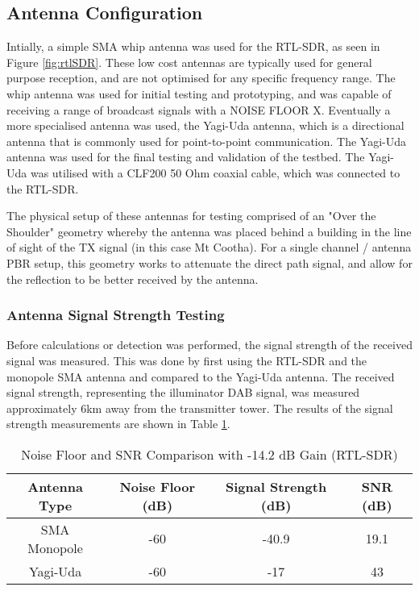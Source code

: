 \subsection{Antenna Configuration \label{sec:antenna}}
Intially, a simple SMA whip antenna was used for the RTL-SDR, as seen in Figure \ref{fig:rtlSDR}. These low cost antennas are typically used for general purpose reception, and are not optimised for any specific frequency range. The whip antenna was used for initial testing and prototyping, and was capable of receiving a range of broadcast signals with a NOISE FLOOR X. Eventually a more specialised antenna was used, the Yagi-Uda antenna, which is a directional antenna that is commonly used for point-to-point communication. The Yagi-Uda antenna was used for the final testing and validation of the testbed. The Yagi-Uda was utilised with a CLF200 50 Ohm coaxial cable, which was connected to the RTL-SDR. 



The physical setup of these antennas for testing comprised of an "Over the Shoulder" geometry whereby the antenna was placed behind a building in the line of sight of the TX signal (in this case Mt Cootha). For a single channel / antenna PBR setup, this geometry works to attenuate the direct path signal, and allow for the reflection to be better received by the antenna. 

\subsubsection{Antenna Signal Strength Testing} 
Before calculations or detection was performed, the signal strength of the received signal was measured. This was done by first using the RTL-SDR and the monopole SMA antenna and compared to the Yagi-Uda antenna. The received signal strength, representing the illuminator DAB signal, was measured approximately 6km away from the transmitter tower.  The results of the signal strength measurements are shown in Table \ref{tab:signalstrength}.

\begin{table}[h!]
    \centering
    \caption{Noise Floor and SNR Comparison with -14.2 dB Gain (RTL-SDR)}
    \label{tab:signalstrength}
    \begin{tabular}{|c|c|c|c|}
        \hline
        \textbf{Antenna Type} & \textbf{Noise Floor (dB)} & \textbf{Signal Strength (dB)} & \textbf{SNR (dB)} \\ \hline
        SMA Monopole & -60 & -40.9 & 19.1 \\ \hline
        Yagi-Uda     & -60 & -17   & 43   \\ \hline
    \end{tabular}
    \vspace{0.5cm}
\end{table}

